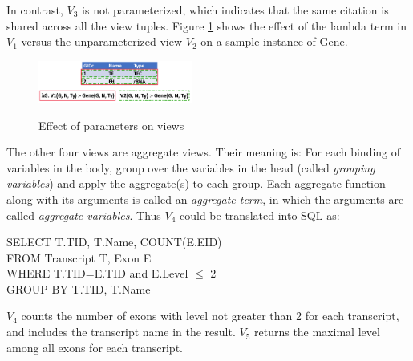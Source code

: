 In contrast, $V_3$ is not parameterized, which indicates that the same citation is shared across all the view tuples. 
Figure \ref{fig:lambda} shows the effect of the lambda term in $V_1$ versus the unparameterized view $V_2$ on a sample instance of Gene.
\begin{figure}[t!]
    \centering
    \includegraphics[width=0.45\textwidth,height=0.11\textwidth]{Figures/GIDsExample.pdf}
    \caption{Effect of parameters on views}
    \small \label{fig:lambda}
\end{figure}
The other four views are aggregate views. Their meaning is:  For each binding of variables in the body, group over the variables  in the head (called {\em grouping variables}) and apply the aggregate(s) to each group. Each {aggregate function} along with its arguments is called an {\em aggregate term}, in which the arguments are called {\em aggregate variables}.
Thus $V_4$ could be translated into SQL as:
\begin{tabbing}
SELECT T.TID, T.Name, COUNT(E.EID)\\
FROM Transcript T, Exon E\\
WHERE T.TID=E.TID and E.Level $\leq$ 2\\
GROUP BY T.TID, T.Name
\end{tabbing}
$V_4$ counts the number of exons  with level not greater than 2 for each transcript, and includes the transcript name in the result.
$V_5$ returns the maximal level among all exons for each transcript. 

